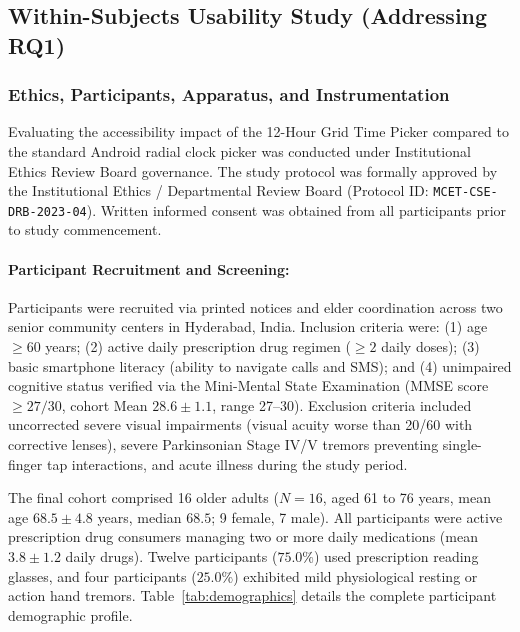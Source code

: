 \documentclass[11pt,a4paper]{article}
\begin{document}
\subsection{Within-Subjects Usability Study (Addressing RQ1)}
\label{sec:usability_study}

\subsubsection{Ethics, Participants, Apparatus, and Instrumentation}
Evaluating the accessibility impact of the 12-Hour Grid Time Picker compared to the standard Android radial clock picker was conducted under Institutional Ethics Review Board governance. The study protocol was formally approved by the Institutional Ethics / Departmental Review Board (Protocol ID: \texttt{MCET-CSE-DRB-2023-04}). Written informed consent was obtained from all participants prior to study commencement.

\paragraph{Participant Recruitment and Screening:} Participants were recruited via printed notices and elder coordination across two senior community centers in Hyderabad, India. Inclusion criteria were: (1) age $\ge 60$ years; (2) active daily prescription drug regimen ($\ge 2$ daily doses); (3) basic smartphone literacy (ability to navigate calls and SMS); and (4) unimpaired cognitive status verified via the Mini-Mental State Examination (MMSE score $\ge 27/30$, cohort Mean $28.6 \pm 1.1$, range 27--30). Exclusion criteria included uncorrected severe visual impairments (visual acuity worse than 20/60 with corrective lenses), severe Parkinsonian Stage IV/V tremors preventing single-finger tap interactions, and acute illness during the study period.

The final cohort comprised 16 older adults ($N=16$, aged 61 to 76 years, mean age $68.5 \pm 4.8$ years, median $68.5$; 9 female, 7 male). All participants were active prescription drug consumers managing two or more daily medications (mean $3.8 \pm 1.2$ daily drugs). Twelve participants ($75.0\%$) used prescription reading glasses, and four participants ($25.0\%$) exhibited mild physiological resting or action hand tremors. Table~\ref{tab:demographics} details the complete participant demographic profile.
\end{document}

